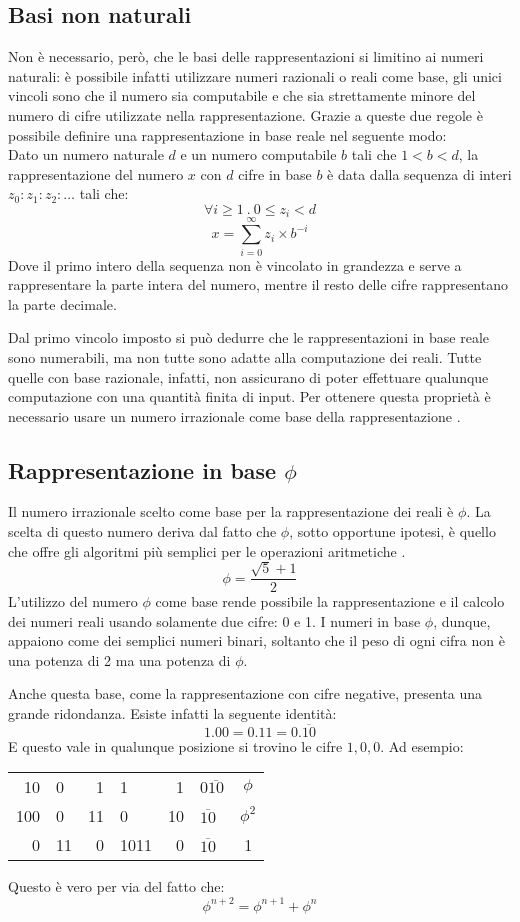 \documentclass[Lau]{sapthesis}
\begin{document}
\subsection{Basi non naturali}\label{basi-non-naturali}
Non è necessario, però, che le basi delle rappresentazioni si limitino ai numeri naturali: è possibile infatti utilizzare numeri razionali o reali come base, gli unici vincoli sono che il numero sia computabile e che sia strettamente minore del numero di cifre utilizzate nella rappresentazione. Grazie a queste due regole è possibile definire una rappresentazione in base reale nel seguente modo:\\
Dato un numero naturale $d$ e un numero computabile $b$ tali che $1<b<d$, la rappresentazione del numero $x$ con $d$ cifre in base $b$ è data dalla sequenza di interi $z_0:z_1:z_2:\ldots$ tali che:
$$\forall i \geq 1 \ . \ 0\leq z_i < d$$
$$x=\sum_{i=0}^\infty z_i \times b^{-i}$$
Dove il primo intero della sequenza non è vincolato in grandezza e serve a rappresentare la parte intera del numero, mentre il resto delle cifre rappresentano la parte decimale.

Dal primo vincolo imposto si può dedurre che le rappresentazioni in base reale sono numerabili, ma non tutte sono adatte alla computazione dei reali. Tutte quelle con base razionale, infatti, non assicurano di poter effettuare qualunque computazione con una quantità finita di input. Per ottenere questa proprietà è necessario usare un numero irrazionale come base della rappresentazione \cite{PietroDiGianantonio}.


\subsection{Rappresentazione in base $\phi$}\label{rappresentazione-phi}
Il numero irrazionale scelto come base per la rappresentazione dei reali è $\phi$. La scelta di questo numero deriva dal fatto che $\phi$, sotto opportune ipotesi, è quello che offre gli algoritmi più semplici per le operazioni aritmetiche \cite{PietroDiGianantonio}.
$$\phi = \frac{\sqrt{5}+1}{2}$$
L'utilizzo del numero $\phi$ come base rende possibile la rappresentazione e il calcolo dei numeri reali usando solamente due cifre: 0 e 1. I numeri in base $\phi$, dunque, appaiono come dei semplici numeri binari, soltanto che il peso di ogni cifra non è una potenza di 2 ma una potenza di $\phi$.

Anche questa base, come la rappresentazione con cifre negative, presenta una grande ridondanza. Esiste infatti la seguente identità:
$$1.00 = 0.11 = 0.\overline{10}$$
E questo vale in qualunque posizione si trovino le cifre $1,0,0$. Ad esempio:
\begin{center}
\begin{tabular}{r@{.}l@{ = }r@{.}l@{ = }r@{.}l@{ = }c}
10  & 0 & 1  & 1 & 1  & 0$\overline{10}$ & $\phi$\\
100 & 0 & 11 & 0 & 10 &  $\overline{10}$ & $\phi^2$\\
0 & 11 & 0 & 1011 & 0 & $\overline{10}$ & 1
\end{tabular}
\end{center}
Questo è vero per via del fatto che:
$$\phi^{n+2} = \phi^{n+1} + \phi^n$$
\end{document}

